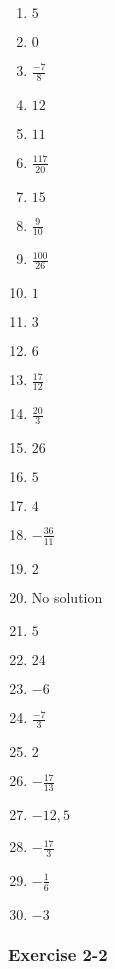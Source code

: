 {\begin{multicols}{3}
\begin{enumerate}[itemsep=1pt, label=\textbf{\arabic*}. ] 
\item $5$%
\item $0$%
\item $\frac{-7}{8}$ %
\item $12$%
\item $11$%
\item $\frac{117}{20}$%
\item$15$ %
\item$\frac{9}{10}$ %
\item $\frac{100}{26}$ %
\item $1$%
\item $3$%
\item $6$%
\item $\frac{17}{12}$%
\item $\frac{20}{3}$%
\item $26$%
\item $5$%
\item $4$%
\item $-\frac{36}{11}$%
\item $2$%
\item No solution%
\item $5$%
\item $24$%
\item $-6$%
\item $\frac{-7}{3}$%
\item $2$
\item $-\frac{17}{13}$
\item $-12,5$
\item $-\frac{17}{3}$
\item $-\frac{1}{6}$
\item $-3$
\end{enumerate}



\subsubsection*{Exercise 2-2} %


\end{multicols}}
